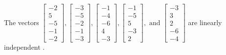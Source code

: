 \begin{exercise}
\begin{exerciseStatement}
  \end{exerciseStatement}
  \begin{exerciseAnswer}
   The vectors \(\left[\begin{array}{r}
-2 \\
5 \\
-5 \\
-1 \\
-2
\end{array}\right] , \left[\begin{array}{r}
-3 \\
-5 \\
-2 \\
-1 \\
-3
\end{array}\right] , \left[\begin{array}{r}
-1 \\
-4 \\
-6 \\
4 \\
-3
\end{array}\right] , \left[\begin{array}{r}
-1 \\
-5 \\
5 \\
-3 \\
2
\end{array}\right] , \text{ and } \left[\begin{array}{r}
-3 \\
3 \\
2 \\
-6 \\
-4
\end{array}\right]\) are 
  	 linearly independent  .
  


  \end{exerciseAnswer}
\end{exercise}